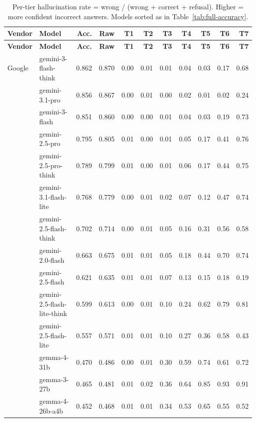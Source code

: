 \small
\setlength{\tabcolsep}{4pt}
\begin{longtable}{@{}ll rr rrrrrrr@{}}
\caption{Per-tier hallucination rate = wrong / (wrong + correct + refusal). Higher = more confident incorrect answers. Models sorted as in Table~\ref{tab:full-accuracy}.}
\label{tab:full-hallucination} \\
\toprule
\textbf{Vendor} & \textbf{Model} & \textbf{Acc.} & \textbf{Raw} & \textbf{T1} & \textbf{T2} & \textbf{T3} & \textbf{T4} & \textbf{T5} & \textbf{T6} & \textbf{T7} \\
\midrule
\endfirsthead
\toprule
\textbf{Vendor} & \textbf{Model} & \textbf{Acc.} & \textbf{Raw} & \textbf{T1} & \textbf{T2} & \textbf{T3} & \textbf{T4} & \textbf{T5} & \textbf{T6} & \textbf{T7} \\
\midrule
\endhead
\bottomrule
\endfoot
Google & gemini-3-flash-think & 0.862 & 0.870 & 0.00 & 0.01 & 0.01 & 0.04 & 0.03 & 0.17 & 0.68 \\
 & gemini-3.1-pro & 0.856 & 0.867 & 0.00 & 0.01 & 0.00 & 0.02 & 0.01 & 0.02 & 0.24 \\
 & gemini-3-flash & 0.851 & 0.860 & 0.00 & 0.00 & 0.01 & 0.04 & 0.03 & 0.19 & 0.73 \\
 & gemini-2.5-pro & 0.795 & 0.805 & 0.01 & 0.00 & 0.01 & 0.05 & 0.17 & 0.41 & 0.76 \\
 & gemini-2.5-pro-think & 0.789 & 0.799 & 0.01 & 0.00 & 0.01 & 0.06 & 0.17 & 0.44 & 0.75 \\
 & gemini-3.1-flash-lite & 0.768 & 0.779 & 0.00 & 0.01 & 0.02 & 0.07 & 0.12 & 0.47 & 0.74 \\
 & gemini-2.5-flash-think & 0.702 & 0.714 & 0.00 & 0.01 & 0.05 & 0.16 & 0.31 & 0.56 & 0.58 \\
 & gemini-2.0-flash & 0.663 & 0.675 & 0.01 & 0.01 & 0.05 & 0.18 & 0.44 & 0.70 & 0.74 \\
 & gemini-2.5-flash & 0.621 & 0.635 & 0.01 & 0.01 & 0.07 & 0.13 & 0.15 & 0.18 & 0.19 \\
 & gemini-2.5-flash-lite-think & 0.599 & 0.613 & 0.00 & 0.01 & 0.10 & 0.24 & 0.62 & 0.79 & 0.81 \\
 & gemini-2.5-flash-lite & 0.557 & 0.571 & 0.01 & 0.01 & 0.10 & 0.27 & 0.36 & 0.58 & 0.43 \\
 & gemma-4-31b & 0.470 & 0.486 & 0.00 & 0.01 & 0.30 & 0.59 & 0.74 & 0.61 & 0.72 \\
 & gemma-3-27b & 0.465 & 0.481 & 0.01 & 0.02 & 0.36 & 0.64 & 0.85 & 0.93 & 0.91 \\
 & gemma-4-26b-a4b & 0.452 & 0.468 & 0.01 & 0.01 & 0.34 & 0.53 & 0.65 & 0.55 & 0.52 \\

\end{longtable}
